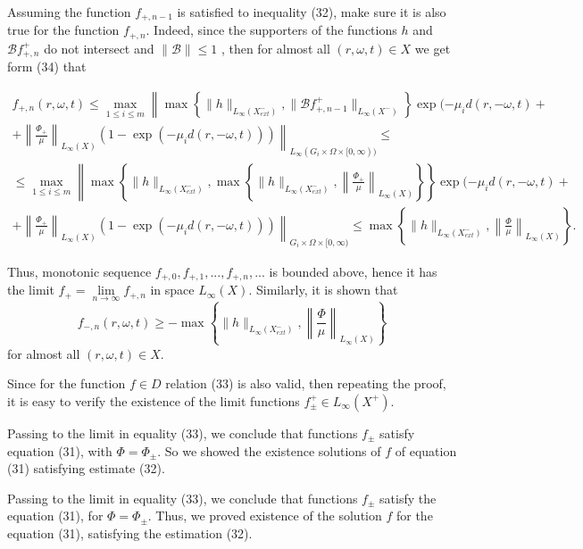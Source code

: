 \documentclass[12pt,reqno]{report}
\begin{document}
Assuming the function $f_{+, n-1}$ is satisfied to inequality (32), 
make sure it is also true for the function $f_{+, n}$.
Indeed, since the supporters of the functions $h$ and ${\mathcal B} f^+_{+, n}$ do 
not intersect and  $\|{\mathcal B}\| \leq 1$ , then for almost all
$(r,\omega,t)\in X$ we get form (34) that

\begin{multline}
f_{+,n}(r,\omega,t) \leq \max \limits _{1\leq i \leq m} \left\|
\max \left\{\|h\|_{L_{\infty}(X^-_{ext})}, \|\mathcal B f^+_{+,n-1}\|_{L_{\infty}(X^-)}
\right\} \exp (- \mu_i d(r,-\omega,t) + \right.
\\
\left.
+ \left\|\frac{\Phi_+}{\mu} \right\|_{L_{\infty}(X)}
\left(1-\exp (- \mu_i d(r,-\omega,t)) \right) \right\|_{L_{\infty}(G_i \times
	\Omega \times [0,\infty))} \leq \\ \leq
\max \limits _{1\leq i \leq m} \left\|
\max \left\{\|h\|_{L_{\infty}(X^-_{ext})}, \max \left\{\|h\|_{L_{\infty}(X^-_{ext})},
\left\|\frac{\Phi_+}{\mu} \right\|_{L_{\infty}(X)} \right\} \right\} \exp (-
\mu_i d(r,-\omega,t) + \right.
\\
\left.
+ \left\|\frac{\Phi_+}{\mu} \right\|_{L_{\infty}(X)}
\left(1-\exp (- \mu_i d(r,-\omega,t)) \right) \right\|_{G_i \times
	\Omega \times [0,\infty)} \leq \max \left\{\|h\|_{L_{\infty}(X^-_{ext})},
\left\|\frac{\Phi}{\mu} \right\|_{L_{\infty}(X)} \right\}.
\end{multline}

Thus, monotonic sequence $f_{+,0},
f_{+,1},..., f_{+,n},...$ is bounded above, hence it has the limit $f_+=\lim \limits_{n \to \infty} f_{+,n}$ 
in space $L_{\infty} (X)$. Similarly, it is shown that
$$
f_{-,n}(r,\omega,t) \geq -\max \left\{\|h\|_{L_{\infty}(X^-_{ext})},
\left\|\frac{\Phi}{\mu} \right\|_{L_{\infty}(X )}\right\}
$$
for almost all $(r,\omega,t)\in X$.

Since for the function $f \in D$ relation (33) is also valid, then repeating the proof, it is easy to verify
the existence of the limit functions $f^+_{\pm} \in L_{\infty}(X^+)$.

Passing to the limit in equality (33), we conclude that
functions $ f _ {\pm} $ satisfy equation (31), with
$ \Phi = \Phi _ {\pm} $. So we showed the existence
solutions of $ f $ of equation (31) satisfying estimate (32).

Passing to the limit in equality (33), we conclude that
functions $f_{\pm}$ satisfy the equation (31), for
$\Phi=\Phi_{\pm}$. Thus, we proved existence of the solution $f$ for the equation (31), 
satisfying the estimation (32).
\end{document}
